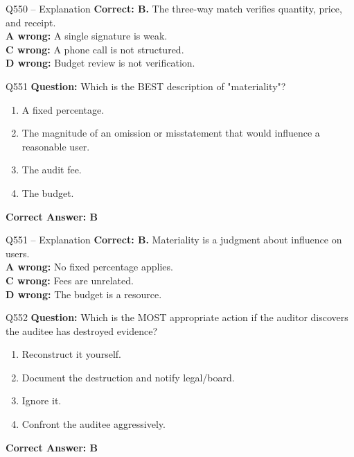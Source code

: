 \documentclass[aspectratio=169,10pt]{beamer}
\begin{document}
	\begin{frame}[t]{Q550 -- Explanation}
		\small
		\textbf{Correct: B.} The three-way match verifies quantity, price, and receipt. \\[4pt]
		\textbf{A wrong:} A single signature is weak. \\[2pt]
		\textbf{C wrong:} A phone call is not structured. \\[2pt]
		\textbf{D wrong:} Budget review is not verification.
	\end{frame}
	
	\begin{frame}[t]{Q551}
		\small
		\textbf{Question:} Which is the BEST description of "materiality"?
		\begin{enumerate}[label=\Alph*.,itemsep=1pt,topsep=2pt]
			\item A fixed percentage.
			\item The magnitude of an omission or misstatement that would influence a reasonable user.
			\item The audit fee.
			\item The budget.
		\end{enumerate}
		\vspace{4pt}
		\textbf{Correct Answer: B}
	\end{frame}
	
	\begin{frame}[t]{Q551 -- Explanation}
		\small
		\textbf{Correct: B.} Materiality is a judgment about influence on users. \\[4pt]
		\textbf{A wrong:} No fixed percentage applies. \\[2pt]
		\textbf{C wrong:} Fees are unrelated. \\[2pt]
		\textbf{D wrong:} The budget is a resource.
	\end{frame}
	
	\begin{frame}[t]{Q552}
		\small
		\textbf{Question:} Which is the MOST appropriate action if the auditor discovers the auditee has destroyed evidence?
		\begin{enumerate}[label=\Alph*.,itemsep=1pt,topsep=2pt]
			\item Reconstruct it yourself.
			\item Document the destruction and notify legal/board.
			\item Ignore it.
			\item Confront the auditee aggressively.
		\end{enumerate}
		\vspace{4pt}
		\textbf{Correct Answer: B}
	\end{frame}
	
\end{document}
